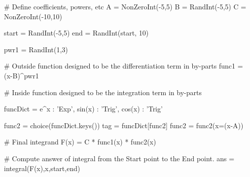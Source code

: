 %
%
%
%
%
%
%


\begin{sagesilent}
# Define coefficients, powers, etc
A = NonZeroInt(-5,5)
B = RandInt(-5,5)
C = NonZeroInt(-10,10)

start = RandInt(-5,5)
end = RandInt(start, 10)

pwr1 = RandInt(1,3)

# Outside function designed to be the differentiation term in by-parts
func1 = (x-B)^pwr1

# Inside function designed to be the integration term in by-parts

funcDict = {
  e^x     : 'Exp',
  sin(x)  : 'Trig',
  cos(x)  : 'Trig'
}

func2 = choice(funcDict.keys())
tag = funcDict[func2]
func2 = func2(x=(x-A))

# Final integrand
F(x) = C * func1(x) * func2(x)

# Compute answer of integral from the Start point to the End point.
ans = integral(F(x),x,start,end)



\end{sagesilent}


